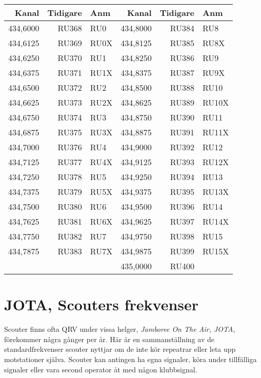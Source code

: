 \clearpage
\begin{longtable}{rrl|rrl}
\textbf{Kanal} & \textbf{Tidigare} & \textbf{Anm}   
&  \textbf{Kanal} & \textbf{Tidigare} & \textbf{Anm} \\ \hline
	434,6000 & RU368 & RU0  & 434,8000 & RU384 & RU8  \\
	434,6125 & RU369 & RU0X & 434,8125 & RU385 & RU8X \\
	434,6250 & RU370 & RU1  & 434,8250 & RU386 & RU9  \\
	434,6375 & RU371 & RU1X & 434,8375 & RU387 & RU9X \\
	434,6500 & RU372 & RU2  & 434,8500 & RU388 & RU10 \\
	434,6625 & RU373 & RU2X & 434,8625 & RU389 & RU10X\\
	434,6750 & RU374 & RU3  & 434,8750 & RU390 & RU11 \\
	434,6875 & RU375 & RU3X & 434,8875 & RU391 & RU11X\\
	434,7000 & RU376 & RU4  & 434,9000 & RU392 & RU12 \\
	434,7125 & RU377 & RU4X & 434,9125 & RU393 & RU12X\\
	434,7250 & RU378 & RU5  & 434,9250 & RU394 & RU13 \\
	434,7375 & RU379 & RU5X & 434,9375 & RU395 & RU13X\\
	434,7500 & RU380 & RU6  & 434,9500 & RU396 & RU14 \\
	434,7625 & RU381 & RU6X & 434,9625 & RU397 & RU14X\\
	434,7750 & RU382 & RU7  & 434,9750 & RU398 & RU15 \\
	434,7875 & RU383 & RU7X & 434,9875 & RU399 & RU15X\\
	         &       &      & 435,0000 & RU400 &     \\
\end{longtable}

\clearpage

\section{JOTA, Scouters frekvenser}

Scouter finns ofta QRV under vissa helger, \textit{Jamboree On The
  Air, JOTA}, förekommer några gånger per år. Här är en
sammanställning av de standardfrekvenser scouter nyttjar om de inte
kör repeatrar eller leta upp motstationer själva. Scouter kan antingen
ha egna signaler, köra under tillfälliga signaler eller vara second
operator åt med någon klubbsignal.

